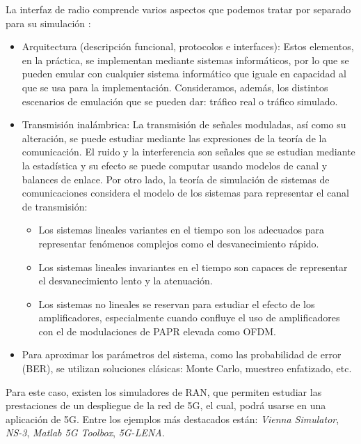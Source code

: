 \documentclass[12pt]{report} %
\begin{document}
La interfaz de radio comprende varios aspectos que podemos tratar por separado para su simulación \cite{RefWorks:95}:
\begin{itemize}
\item Arquitectura (descripción funcional, protocolos e interfaces):
Estos elementos, en la práctica, se implementan mediante sistemas informáticos,
por lo que se pueden emular con cualquier sistema informático que iguale en capacidad al que se usa para la implementación.
Consideramos, además, los distintos escenarios de emulación que se pueden dar: tráfico real o tráfico simulado.
\item Transmisión inalámbrica:
La transmisión de señales moduladas, así como su alteración, se puede estudiar mediante las expresiones de la teoría de la comunicación.
El ruido y la interferencia son señales que se estudian mediante la estadística
y su efecto se puede computar usando modelos de canal y balances de enlace.
Por otro lado, la teoría de simulación de sistemas de comunicaciones considera el modelo de los sistemas para representar el canal de transmisión:
\begin{itemize}
\item Los sistemas lineales variantes en el tiempo son los adecuados para representar fenómenos complejos como el desvanecimiento rápido.
\item Los sistemas lineales invariantes en el tiempo son capaces de representar el desvanecimiento lento y la atenuación.
\item Los sistemas no lineales se reservan para estudiar el efecto de los amplificadores, especialmente cuando confluye el uso de amplificadores con el de modulaciones de PAPR elevada como OFDM.
\end{itemize}
\item Para aproximar los parámetros del sistema, como las probabilidad de error (BER), se utilizan soluciones clásicas: Monte Carlo, muestreo enfatizado, etc.
\end{itemize}


Para este caso, existen los simuladores de RAN,
que permiten estudiar las prestaciones de un despliegue de la red de 5G, el cual, podrá usarse en una aplicación de 5G.
Entre los ejemplos más destacados están: \textit{Vienna Simulator}, \textit{NS-3}, \textit{Matlab 5G Toolbox}, \textit{5G-LENA}.
\cite{RefWorks:3, RefWorks:5}
\end{document}
